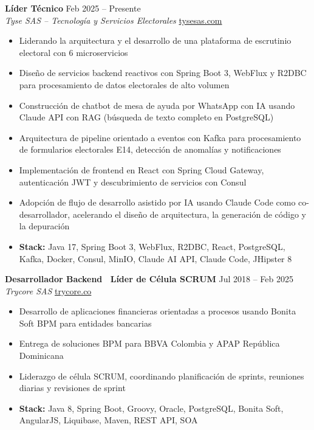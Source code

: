\documentclass[11pt,a4paper]{article}
\begin{document}
\textbf{L\'{i}der T\'{e}cnico} \hfill {\color{lighttext} Feb 2025 -- Presente} \\
\textit{Tyse SAS -- Tecnolog\'{i}a y Servicios Electorales} \hfill \href{https://www.tysesas.com}{tysesas.com}
\begin{itemize}
    \item Liderando la arquitectura y el desarrollo de una plataforma de escrutinio electoral con 6 microservicios
    \item Dise\~{n}o de servicios backend reactivos con Spring Boot 3, WebFlux y R2DBC para procesamiento de datos electorales de alto volumen
    \item Construcci\'{o}n de chatbot de mesa de ayuda por WhatsApp con IA usando Claude API con RAG (b\'{u}squeda de texto completo en PostgreSQL)
    \item Arquitectura de pipeline orientado a eventos con Kafka para procesamiento de formularios electorales E14, detecci\'{o}n de anomal\'{i}as y notificaciones
    \item Implementaci\'{o}n de frontend en React con Spring Cloud Gateway, autenticaci\'{o}n JWT y descubrimiento de servicios con Consul
    \item Adopci\'{o}n de flujo de desarrollo asistido por IA usando Claude Code como co-desarrollador, acelerando el dise\~{n}o de arquitectura, la generaci\'{o}n de c\'{o}digo y la depuraci\'{o}n
    \item \textbf{Stack:} Java 17, Spring Boot 3, WebFlux, R2DBC, React, PostgreSQL, Kafka, Docker, Consul, MinIO, Claude AI API, Claude Code, JHipster 8
\end{itemize}

\vspace{4pt}

\textbf{Desarrollador Backend \textbar\ L\'{i}der de C\'{e}lula SCRUM} \hfill {\color{lighttext} Jul 2018 -- Feb 2025} \\
\textit{Trycore SAS} \hfill \href{https://www.trycore.co}{trycore.co}
\begin{itemize}
    \item Desarrollo de aplicaciones financieras orientadas a procesos usando Bonita Soft BPM para entidades bancarias
    \item Entrega de soluciones BPM para BBVA Colombia y APAP Rep\'{u}blica Dominicana
    \item Liderazgo de c\'{e}lula SCRUM, coordinando planificaci\'{o}n de sprints, reuniones diarias y revisiones de sprint
    \item \textbf{Stack:} Java 8, Spring Boot, Groovy, Oracle, PostgreSQL, Bonita Soft, AngularJS, Liquibase, Maven, REST API, SOA
\end{itemize}
\end{document}
